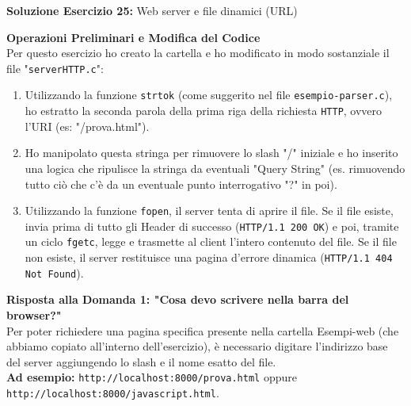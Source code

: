 \documentclass[11pt]{article}
\begin{document}
\begin{tcolorbox}[colback=green!5!white,colframe=green!75!black,title=\textbf{RISPOSTA}, breakable]
\textbf{Soluzione Esercizio 25:} Web server e file dinamici (URL)

\textbf{Operazioni Preliminari e Modifica del Codice}\\
Per questo esercizio ho creato la cartella e ho modificato in modo sostanziale il file "\texttt{serverHTTP.c}":
\begin{enumerate}
    \item Utilizzando la funzione \texttt{strtok} (come suggerito nel file \texttt{esempio-parser.c}), ho estratto la seconda parola della prima riga della richiesta \texttt{HTTP}, ovvero l'URI (es: "/prova.html").
    \item Ho manipolato questa stringa per rimuovere lo slash "/" iniziale e ho inserito una logica che ripulisce la stringa da eventuali "Query String" (es. rimuovendo tutto ciò che c'è da un eventuale punto interrogativo "?" in poi).
    \item Utilizzando la funzione \texttt{fopen}, il server tenta di aprire il file. Se il file esiste, invia prima di tutto gli Header di successo (\texttt{HTTP/1.1 200 OK}) e poi, tramite un ciclo \texttt{fgetc}, legge e trasmette al client l'intero contenuto del file. Se il file non esiste, il server restituisce una pagina d'errore dinamica (\texttt{HTTP/1.1 404 Not Found}).
\end{enumerate}

\textbf{Risposta alla Domanda 1: "Cosa devo scrivere nella barra del browser?"}\\
Per poter richiedere una pagina specifica presente nella cartella Esempi-web (che abbiamo copiato all'interno dell'esercizio), è necessario digitare l'indirizzo base del server aggiungendo lo slash e il nome esatto del file.\\
\textbf{Ad esempio:} \texttt{http://localhost:8000/prova.html} oppure \texttt{http://localhost:8000/javascript.html}.


\end{tcolorbox}
\end{document}
